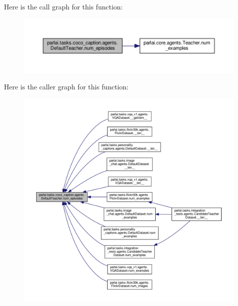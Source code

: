 Here is the call graph for this function\+:
\nopagebreak
\begin{figure}[H]
\begin{center}
\leavevmode
\includegraphics[width=350pt]{classparlai_1_1tasks_1_1coco__caption_1_1agents_1_1DefaultTeacher_a688ac5a25bb6bb79b57550ecdec0eab1_cgraph}
\end{center}
\end{figure}
Here is the caller graph for this function\+:
\nopagebreak
\begin{figure}[H]
\begin{center}
\leavevmode
\includegraphics[width=350pt]{classparlai_1_1tasks_1_1coco__caption_1_1agents_1_1DefaultTeacher_a688ac5a25bb6bb79b57550ecdec0eab1_icgraph}
\end{center}
\end{figure}
\mbox{\label{classparlai_1_1tasks_1_1coco__caption_1_1agents_1_1DefaultTeacher_abc57dc81be0b084f28af97aa62c2d531}} 
